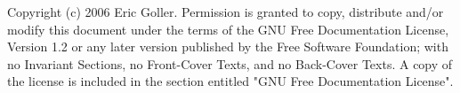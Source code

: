 Copyright (c)  2006 Eric Goller.
  Permission is granted to copy, distribute and/or modify this document
  under the terms of the GNU Free Documentation License, Version 1.2
  or any later version published by the Free Software Foundation;
  with no Invariant Sections, no Front-Cover Texts, and no Back-Cover
  Texts.  A copy of the license is included in the section entitled "GNU
  Free Documentation License".
